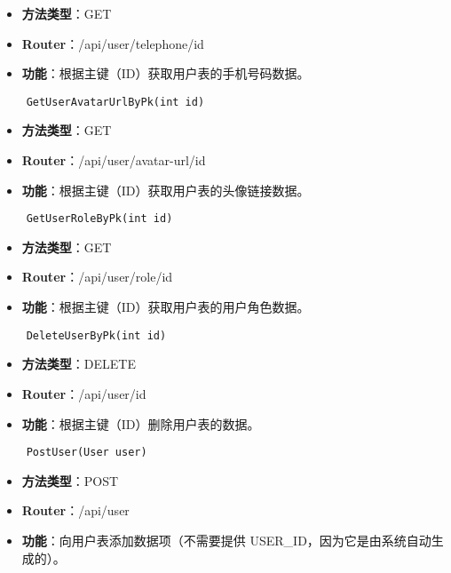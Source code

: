\begin{itemize}
	\item \textbf{方法类型}：GET
	\item \textbf{Router}：/api/user/telephone/{id}
	\item \textbf{功能}：根据主键（ID）获取用户表的手机号码数据。
\end{itemize}

\begin{verbatim}
	GetUserAvatarUrlByPk(int id)
\end{verbatim}

\begin{itemize}
	\item \textbf{方法类型}：GET
	\item \textbf{Router}：/api/user/avatar-url/{id}
	\item \textbf{功能}：根据主键（ID）获取用户表的头像链接数据。
\end{itemize}

\begin{verbatim}
	GetUserRoleByPk(int id)
\end{verbatim}

\begin{itemize}
	\item \textbf{方法类型}：GET
	\item \textbf{Router}：/api/user/role/{id}
	\item \textbf{功能}：根据主键（ID）获取用户表的用户角色数据。
\end{itemize}

\begin{verbatim}
	DeleteUserByPk(int id)
\end{verbatim}

\begin{itemize}
	\item \textbf{方法类型}：DELETE
	\item \textbf{Router}：/api/user/{id}
	\item \textbf{功能}：根据主键（ID）删除用户表的数据。
\end{itemize}

\begin{verbatim}
	PostUser(User user)
\end{verbatim}

\begin{itemize}
	\item \textbf{方法类型}：POST
	\item \textbf{Router}：/api/user
	\item \textbf{功能}：向用户表添加数据项（不需要提供 USER\_ID，因为它是由系统自动生成的）。
\end{itemize}

